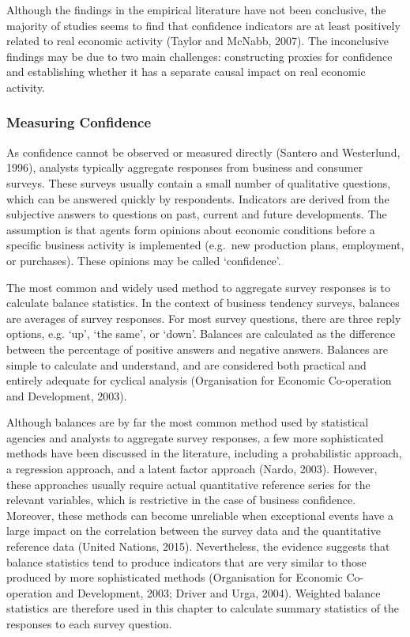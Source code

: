 \documentclass[11pt,]{article}
\begin{document}
Although the findings in the empirical literature have not been
conclusive, the majority of studies seems to find that confidence
indicators are at least positively related to real economic activity
(Taylor and McNabb, 2007). The inconclusive findings may be due to two
main challenges: constructing proxies for confidence and establishing
whether it has a separate causal impact on real economic activity.

\subsubsection{Measuring Confidence}\label{measuring-confidence}

As confidence cannot be observed or measured directly (Santero and
Westerlund, 1996), analysts typically aggregate responses from business
and consumer surveys. These surveys usually contain a small number of
qualitative questions, which can be answered quickly by respondents.
Indicators are derived from the subjective answers to questions on past,
current and future developments. The assumption is that agents form
opinions about economic conditions before a specific business activity
is implemented (e.g.~new production plans, employment, or purchases).
These opinions may be called `confidence'.

The most common and widely used method to aggregate survey responses is
to calculate balance statistics. In the context of business tendency
surveys, balances are averages of survey responses. For most survey
questions, there are three reply options, e.g. `up', `the same', or
`down'. Balances are calculated as the difference between the percentage
of positive answers and negative answers. Balances are simple to
calculate and understand, and are considered both practical and entirely
adequate for cyclical analysis (Organisation for Economic Co-operation
and Development, 2003).

Although balances are by far the most common method used by statistical
agencies and analysts to aggregate survey responses, a few more
sophisticated methods have been discussed in the literature, including a
probabilistic approach, a regression approach, and a latent factor
approach (Nardo, 2003). However, these approaches usually require actual
quantitative reference series for the relevant variables, which is
restrictive in the case of business confidence. Moreover, these methods
can become unreliable when exceptional events have a large impact on the
correlation between the survey data and the quantitative reference data
(United Nations, 2015). Nevertheless, the evidence suggests that balance
statistics tend to produce indicators that are very similar to those
produced by more sophisticated methods (Organisation for Economic
Co-operation and Development, 2003; Driver and Urga, 2004). Weighted
balance statistics are therefore used in this chapter to calculate
summary statistics of the responses to each survey question.
\end{document}
